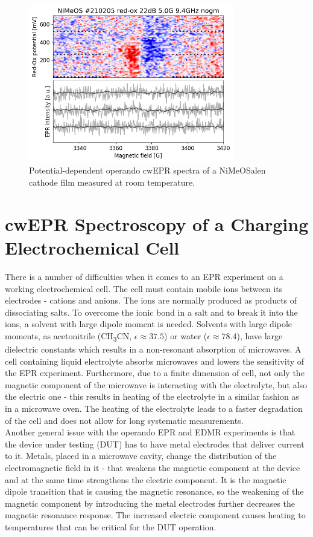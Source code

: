 \begin{figure}[!ht]
\center
	\includegraphics[width=0.8\textwidth]{./operando_epr/figures/backbone/NiMeOS_lyra_overnight_RT.png}
	\caption{Potential-dependent operando cwEPR spectra of a NiMeOSalen cathode film measured at room temperature.}
	\label{fig:cwEPR_RT_NiSalen_OPERANDO}
\end{figure}






\section{cwEPR Spectroscopy of a Charging Electrochemical Cell}
There is a number of difficulties when it comes to an EPR experiment on a working electrochemical cell. The cell must contain mobile ions between its electrodes - cations and anions. The ions are normally produced as products of dissociating salts. To overcome the ionic bond in a salt and to break it into the ions, a solvent with large dipole moment is needed. Solvents with large dipole moments, as acetonitrile (CH\textsubscript{3}CN, $\epsilon\approx 37.5$) or water ($\epsilon\approx78.4$), have large dielectric constants which results in a non-resonant absorption of microwaves. A cell containing liquid electrolyte absorbs microwaves and lowers the sensitivity of the EPR experiment. Furthermore, due to a finite dimension of cell, not only the magnetic component of the microwave is interacting with the electrolyte, but also the electric one - this results in heating of the electrolyte in a similar fashion as in a microwave oven. The heating of the electrolyte leads to a faster degradation of the cell and does not allow for long systematic measurements.\\
Another general issue with the operando EPR and EDMR experiments is that the device under testing (DUT) has to have metal electrodes that deliver current to it. Metals, placed in a microwave cavity, change the distribution of the electromagnetic field in it - that weakens the magnetic component at the device and at the same time strengthens the electric component. It is the magnetic dipole transition that is causing the magnetic resonance, so the weakening of the magnetic component by introducing the metal electrodes further decreases the magnetic resonance response. The increased electric component causes heating to temperatures that can be critical for the DUT operation.



